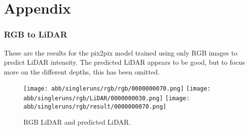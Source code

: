 \chapter{Appendix}
\subsection{RGB to LiDAR}

These are the results for the pix2pix model trained using only RGB images to predict LiDAR intensity. The predicted LiDAR appears to be good, but to focus more on the different depths, this has been omitted.
\begin{figure}[!ht]
	\centering
	\texttt{[image: abb/singleruns/rgb/rgb/0000000070.png]}
	\texttt{[image: abb/singleruns/rgb/LiDAR/0000000030.png]}
	\texttt{[image: abb/singleruns/rgb/result/0000000070.png]}
	\caption{RGB LiDAR and predicted LiDAR.}
	\label{rgb}
\end{figure}



